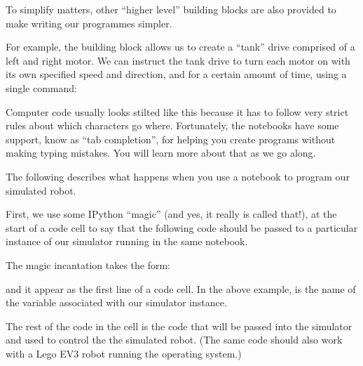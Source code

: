\documentclass[letterpaper,10pt,english]{sphinxmanual}
\begin{document}
To simplify matters, other “higher level”  building blocks are also provided to make writing our programmes simpler.

For example, the  building block allows us to create a “tank” drive comprised of a left and right motor. We can instruct the tank drive to turn each motor on with its own specified speed and direction, and for a certain amount of time, using a single command:

\begin{sphinxVerbatim}[commandchars=\\\{\}]
   
  
\end{sphinxVerbatim}

Computer code usually looks stilted like this because it has to follow very strict rules about which characters go where. Fortunately, the notebooks have some support, know as “tab completion”, for helping you create programs without making typing mistakes. You will learn more about that as we go along.

The following describes what happens when you use a notebook to program our simulated robot.

First, we use some IPython “magic” (and yes, it really is called that!), at the start of a code cell to say that the following code should be passed to a particular instance of our simulator running in the same notebook.

The magic incantation takes the form:


and it  appear as the first line of a code cell. In the above example,  is the name of the variable associated with our simulator instance.

The rest of the code in the cell is the code that will be passed into the simulator and used to control the the simulated robot. (The same code should also work with a  Lego EV3 robot running the  operating system.)
\end{document}
